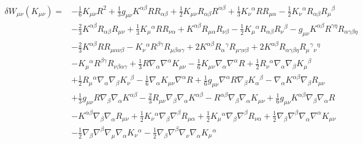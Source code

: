 \documentclass[10pt,letterpaper]{article}
\begin{document}
 \begin{align}
\delta W_{\mu\nu}(K_{\mu\nu})={}&- \tfrac{1}{6} K_{\mu \nu} R^2
 + \tfrac{1}{3} g_{\mu \nu} K^{\alpha \beta} R R_{\alpha \beta}
 + \tfrac{1}{2} K_{\mu \nu} R_{\alpha \beta} R^{\alpha \beta}
 + \tfrac{1}{3} K_{\nu}{}^{\alpha} R R_{\mu \alpha}
 -  \tfrac{1}{2} K_{\nu}{}^{\alpha} R_{\alpha \beta} R_{\mu}{}^{\beta}\nonumber\\
& -  \tfrac{2}{3} K^{\alpha \beta} R_{\alpha \beta} R_{\mu \nu}
 + \tfrac{1}{3} K_{\mu}{}^{\alpha} R R_{\nu \alpha}
 + K^{\alpha \beta} R_{\mu \alpha} R_{\nu \beta}
 -  \tfrac{1}{2} K_{\mu}{}^{\alpha} R_{\alpha \beta} R_{\nu}{}^{\beta}
 -  g_{\mu \nu} K^{\alpha \beta} R^{\gamma \eta} R_{\alpha \gamma \beta \eta}\nonumber\\
& -  \tfrac{2}{3} K^{\alpha \beta} R R_{\mu \alpha \nu \beta}
 -  K_{\nu}{}^{\alpha} R^{\beta \gamma} R_{\mu \beta \alpha \gamma}
 + 2 K^{\alpha \beta} R_{\alpha}{}^{\gamma} R_{\mu \gamma \nu \beta}
 + 2 K^{\alpha \beta} R_{\alpha \gamma \beta \eta} R_{\mu}{}^{\gamma}{}_{\nu}{}^{\eta}\nonumber\\
& -  K_{\mu}{}^{\alpha} R^{\beta \gamma} R_{\nu \beta \alpha \gamma}
 + \tfrac{1}{3} R \nabla_{\alpha}\nabla^{\alpha}K_{\mu \nu}
 -  \tfrac{1}{6} K_{\mu \nu} \nabla_{\alpha}\nabla^{\alpha}R
 + \tfrac{1}{2} R_{\nu}{}^{\alpha} \nabla_{\alpha}\nabla_{\beta}K_{\mu}{}^{\beta}\nonumber\\
& + \tfrac{1}{2} R_{\mu}{}^{\alpha} \nabla_{\alpha}\nabla_{\beta}K_{\nu}{}^{\beta}
 -  \tfrac{1}{6} \nabla_{\alpha}K_{\mu \nu} \nabla^{\alpha}R
 + \tfrac{1}{6} g_{\mu \nu} \nabla^{\alpha}R \nabla_{\beta}K_{\alpha}{}^{\beta}
 -  \nabla_{\alpha}K^{\alpha \beta} \nabla_{\beta}R_{\mu \nu}\nonumber\\
& + \tfrac{1}{3} g_{\mu \nu} R \nabla_{\beta}\nabla_{\alpha}K^{\alpha \beta}
 -  \tfrac{2}{3} R_{\mu \nu} \nabla_{\beta}\nabla_{\alpha}K^{\alpha \beta}
 -  R^{\alpha \beta} \nabla_{\beta}\nabla_{\alpha}K_{\mu \nu}
 + \tfrac{1}{6} g_{\mu \nu} K^{\alpha \beta} \nabla_{\beta}\nabla_{\alpha}R\nonumber\\
& -  K^{\alpha \beta} \nabla_{\beta}\nabla_{\alpha}R_{\mu \nu}
 + \tfrac{1}{2} K_{\nu}{}^{\alpha} \nabla_{\beta}\nabla^{\beta}R_{\mu \alpha}
 + \tfrac{1}{2} K_{\mu}{}^{\alpha} \nabla_{\beta}\nabla^{\beta}R_{\nu \alpha}
 + \tfrac{1}{2} \nabla_{\beta}\nabla^{\beta}\nabla_{\alpha}\nabla^{\alpha}K_{\mu \nu}\nonumber\\
& -  \tfrac{1}{2} \nabla_{\beta}\nabla^{\beta}\nabla_{\mu}\nabla_{\alpha}K_{\nu}{}^{\alpha}
 -  \tfrac{1}{2} \nabla_{\beta}\nabla^{\beta}\nabla_{\nu}\nabla_{\alpha}K_{\mu}{}^{\alpha}

\end{align}
\end{document}
